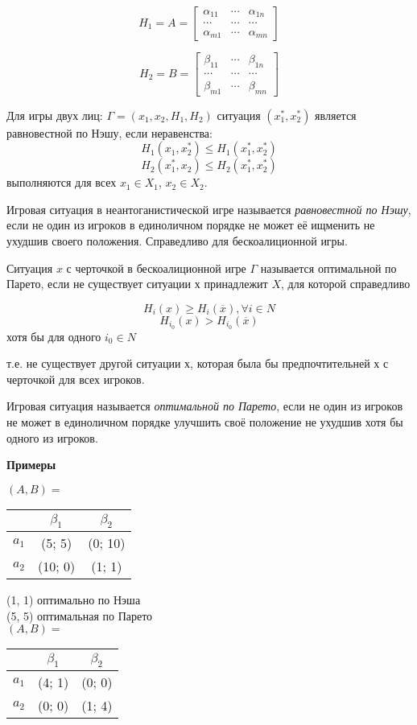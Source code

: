 \documentclass[12pt,a4paper]{article}
\begin{document}
\begin{equation*}
H_1 = A =
\begin{bmatrix}
\alpha_{11} & \cdots & \alpha_{1n}\\
\cdots & \cdots & \cdots\\
\alpha_{m1} & \cdots & \alpha_{mn}
\end{bmatrix}
\end{equation*}

\begin{equation*}
H_2 = B =
\begin{bmatrix}
\beta_{11} & \cdots & \beta_{1n}\\
\cdots & \cdots & \cdots\\
\beta_{m1} & \cdots & \beta_{mn}
\end{bmatrix}
\end{equation*}

Для игры двух лиц: $\Gamma = (x_1, x_2, H_1, H_2)$ ситуация $(x_1^*, x_2^*)$ является равновестной по Нэшу, если неравенства:
$$H_1(x_1, x_2^*) \leq H_1(x_1^*, x_2^*)$$
$$H_2(x_1^*, x_2) \leq H_2(x_1^*, x_2^*)$$
выполняются для всех $x_1 \in X_1$, $x_2 \in X_2$.

Игровая ситуация в неантоганистической игре называется \textit{равновестной по Нэшу}, если не один из игроков в единоличном порядке не может её ищменить не ухудшив своего положения. Справедливо для бескоалиционной игры.

Ситуация $x$ с черточкой в бескоалиционной игре $\Gamma$ называется оптимальной по Парето, если не существует ситуации х принадлежит $X$, для которой справедливо

$$H_i(x) \geqslant H_i(\overline{x}), \forall i \in N$$
$$H_{i_0}(x) > H_{i_0}(\overline{x})$$ хотя бы для одного $i_0 \in N$

т.е. не существует другой ситуации х, которая была бы предпочтительней х с черточкой для всех игроков.

Игровая ситуация называется \textit{оптимальной по Парето}, если не один из игроков не может в единоличном порядке улучшить своё положение не ухудшив хотя бы одного из игроков.

\textbf{Примеры}

$(A, B) = $
\begin{tabular}{|c|c|c|}
\hline 
 & $\beta_1$ & $\beta_2$ \\ 
\hline 
$a_1$ & (5; 5) & (0; 10) \\ 
\hline 
$a_2$ & (10; 0) & (1; 1) \\ 
\hline 
\end{tabular}

(1, 1) оптимально по Нэша\\
(5, 5) оптимальная по Парето\\

$(A, B) = $
\begin{tabular}{|c|c|c|}
\hline 
 & $\beta_1$ & $\beta_2$ \\ 
\hline 
$a_1$ & (4; 1) & (0; 0) \\ 
\hline
$a_2$ & (0; 0) & (1; 4) \\ 
\hline 
\end{tabular} 
\end{document}
